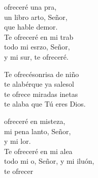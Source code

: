 \begin{cancion}%
	 ofreceré una pra, \\
	un libro arto, Señor,\\
	que hable demor. \\
	Te ofreceré en mi trab \\
	todo mi esrzo, Señor, \\
	y mi sur, te ofreceré. \jump\\
	\begin{chorus}%
		Te ofrecésonrisa de niño\\
		te alabérque ya salesol\\
		te ofrece miradas inetas\\
		te alaba que Tú eres Dios.\jump\\
	\end{chorus}%
	 ofreceré en misteza, \\
	mi pena lanto, Señor,\\
	y mi lor. \\
	Te ofreceré en mi alea\\
	todo mi o, Señor, y mi iluón,\\
	te ofrecer \\
\end{cancion}%
